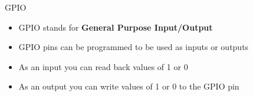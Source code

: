 \begin{frame}
   {GPIO}
   \begin{itemize}
      \item GPIO stands for \textbf{General Purpose Input/Output}
      \item GPIO pins can be programmed to be used as inputs or outputs
      \item As an input you can read back values of 1 or 0
      \item As an output you can write values of 1 or 0 to the GPIO pin
   \end{itemize}
\end{frame}

\cprotect\note{


}

